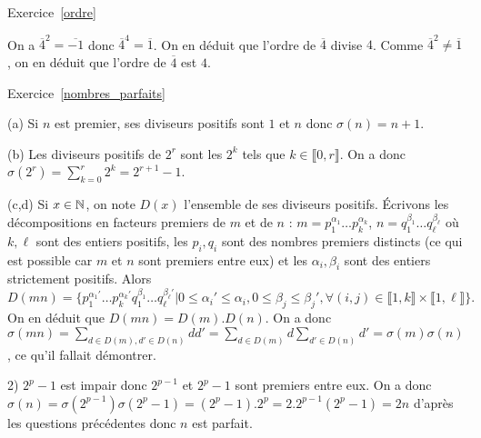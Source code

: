 \documentclass[11pt,a4paper]{article}
\begin{document}
Exercice~\ref{ordre}

On a $\overline{4}^2=\overline{-1}$ donc $\overline{4}^4=\overline{1}$. On en déduit que l'ordre de $\overline{4}$ divise $4$. Comme $\overline{4}^2\neq \overline{1}$, on en déduit que l'ordre de $\overline{4}$ est $4$.

\begin{comment}
Exercice~\ref{ideal}

Soit $I=\Z a+\Z b$. Alors $0\in I$ car $0=0 a+0b$. 

Soient $x,y\in I$. Écrivons $x=ma+nb$ et $y=m'a+n'b$, où $m,m',n,n'\in \Z$. Alors $x+y=(m+m')a+(n+n')b\in I$ car $m+m',n+n'\in \Z$. De plus, $-x=(-m)a+(-n)b\in I$, donc $I$ est un sous-groupe de $\Z$.  Soit $k\in \Z$. Alors $kx=(km)a+(kn)b$, et $km,kn\in \Z$, donc $kx\in I$, donc $I$ est un idéal de $\Z$.
\end{comment}



Exercice~\ref{nombres_parfaits}

(a) Si $n$ est premier, ses diviseurs positifs sont $1$ et $n$ donc $\sigma(n)=n+1$.

(b) Les diviseurs positifs de $2^r$ sont les $2^k$ tels que $k\in \llbracket 0,r\rrbracket$. On a donc $\sigma(2^r)=\sum_{k=0}^r 2^k=2^{r+1}-1$.

(c,d) Si $x\in \mathbb{N}$, on note $D(x)$ l'ensemble de ses diviseurs positifs. Écrivons les décompositions en facteurs premiers de $m$ et de $n$ : $m=p_1^{\alpha_1}\ldots p_k^{\alpha_k}$, $n=q_1^{\beta_1}\ldots q_\ell^{\beta_\ell}$ où $k,\ell$ sont des entiers positifs, les $p_i,q_i$ sont des nombres premiers distincts (ce qui est possible car $m$ et $n$ sont premiers entre eux) et les $\alpha_i,\beta_i$ sont des entiers strictement positifs. Alors \[D(mn)=\{p_1^{\alpha_1'}\ldots p_k^{\alpha_k'} q_1^{\beta_1}\ldots q_\ell^{\beta_\ell'}| 0\leq \alpha_i'\leq \alpha_i, 0\leq \beta_j\leq \beta_j',\forall (i,j)\in \llbracket 1,k\rrbracket\times \llbracket 1,\ell\rrbracket\}.\] On en déduit que $D(mn)=D(m).D(n)$. On a donc $\sigma(mn)=\sum_{d\in D(m),d'\in D(n)} dd'=\sum_{d\in D(m)} d\sum_{d'\in D(n)} d'=\sigma(m)\sigma(n)$, ce qu'il fallait démontrer.

2) $2^p-1$ est impair donc $2^{p-1}$ et $2^p-1$ sont premiers entre eux. On a donc $\sigma(n)=\sigma(2^{p-1})\sigma(2^p-1)=(2^p-1).2^p=2.2^{p-1}(2^p-1)=2n$ d'après les questions précédentes donc $n$ est parfait.
\end{document}
